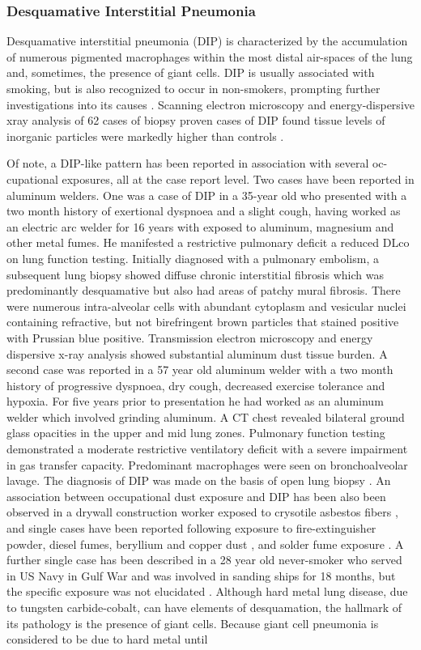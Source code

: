 \documentclass[a4paper,12pt]{article}
\begin{document}
\subsubsection{Desquamative Interstitial Pneumonia}
Desquamative interstitial pneumonia (DIP) is characterized by the accumulation of numerous pigmented macrophages within the most distal air-spaces of the lung and, sometimes, the presence of giant cells. DIP is usually associated with smoking, but is also recognized to occur in non-smokers, prompting further investigations into its causes \cite{Godbert2013}. Scanning electron microscopy and energy-dispersive xray analysis of 62 cases of biopsy proven cases of DIP found tissue levels of inorganic particles were markedly higher than controls \cite{Abraham1981}.

Of note, a DIP-like pattern has been reported in association with several oc- cupational exposures, all at the case report level. Two cases have been reported in aluminum welders. One was a case of DIP in a 35-year old \cite{Herbert1982} who presented with a two month history of exertional dyspnoea and a slight cough, having worked as an electric arc welder for 16 years with exposed to aluminum, magnesium and other metal fumes. He manifested a restrictive pulmonary deficit a reduced DLco on lung function testing. Initially diagnosed with a pulmonary embolism, a subsequent lung biopsy showed diffuse chronic interstitial fibrosis which was predominantly desquamative but also had areas of patchy mural fibrosis. There were numerous intra-alveolar cells with abundant cytoplasm and vesicular nuclei containing refractive, but not birefringent brown particles that stained positive with Prussian blue positive. Transmission electron microscopy and energy dispersive x-ray analysis showed substantial aluminum dust tissue burden. A second case was reported in a 57 year old aluminum welder with a two month history of progressive dyspnoea, dry cough, decreased exercise tolerance and hypoxia. For five years prior to presentation he had worked as an aluminum welder which involved grinding aluminum. A CT chest revealed bilateral ground glass opacities in the upper and mid lung zones. Pulmonary function testing demonstrated a moderate restrictive ventilatory deficit with a severe impairment in gas transfer capacity. Predominant macrophages were seen on bronchoalveolar lavage. The diagnosis of DIP was made on the basis of open lung biopsy \cite{Chelvanathan2011}. An association between occupational dust exposure and DIP has been also been  observed in a drywall construction worker exposed to crysotile asbestos fibers \cite{Freed1991}, and single cases have been reported following exposure to fire-extinguisher powder, diesel fumes, beryllium and copper dust \cite{Craig2004}, and solder fume exposure  \cite{Moon1999}. A further single case has been described in a 28 year old never-smoker who served in US Navy in Gulf War and was involved in sanding ships for 18 months, but the specific exposure was not elucidated \cite{SafdarM2011}. Although hard metal lung disease, due to tungsten carbide-cobalt, can have elements of desquamation, the hallmark of its pathology is the presence of giant cells. Because giant cell pneumonia is considered to be due to hard metal until 
\end{document}
